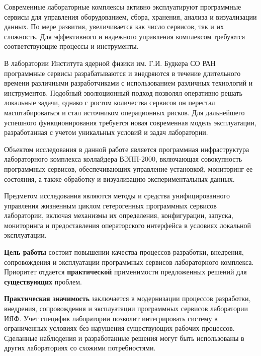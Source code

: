 \documentclass[../thesis.tex]{subfiles}
\begin{document}
	Современные лабораторные комплексы активно эксплуатируют программные сервисы для управления оборудованием,
	сбора, хранения, анализа и визуализации данных. По мере развития, увеличивается как число
	сервисов, так и их сложность. Для эффективного и надежного управления комплексом требуются
	соответствующие процессы и инструменты.

	В лаборатории  Института ядерной физики им. Г.И. Будкера СО РАН программные
	сервисы разрабатываются и внедряются в течение длительного времени различными разработчиками с
	использованием различных технологий и инструментов. Подобный эволюционный подход позволял оперативно
	решать локальные задачи, однако с ростом количества сервисов он перестал масштабироваться и стал
	источником операционных рисков. Для дальнейшего успешного функционирования требуется новая современная
	модель эксплуатации, разработанная с учетом уникальных условий и задач лаборатории.

	Объектом исследования в данной работе является программная инфраструктура лабораторного
	комплекса  коллайдера ВЭПП-2000, включающая совокупность программных сервисов,
	обеспечивающих управление установкой, мониторинг ее состояния, а также обработку и визуализацию
	экспериментальных данных.

	Предметом исследования являются методы и средства унифицированного управления жизненным циклом
	гетерогенных программных сервисов лаборатории, включая механизмы их определения, конфигурации, запуска,
	мониторинга и предоставления операторского интерфейса в условиях локальной эксплуатации.

	\textbf{Цель работы} состоит повышении качества процессов разработки, внедрения, сопровождения и эксплуатации
	программных сервисов лабораторного комплекса. Приоритет отдается \textbf{практической} применимости
	предложенных решений для \textbf{существующих} проблем.

	\textbf{Практическая значимость} заключается в модернизации процессов разработки, внедрения, сопровождения
	и эксплуатации программных сервисов лаборатории  ИЯФ. Учет специфик лаборатории
	позволит интегрировать систему в ограниченных условиях без нарушения существующих рабочих
	процессов. Сделанные наблюдения и разработанные решения могут быть использованы в других лабораториях
	со схожими потребностями.
\end{document}

